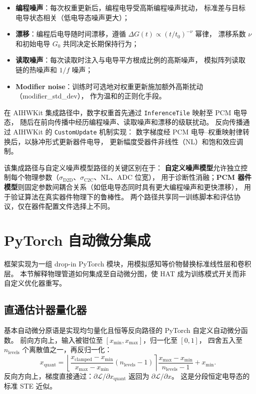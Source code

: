 \begin{itemize}
    \item \textbf{编程噪声}：每次权重更新后，编程电导受高斯编程噪声扰动，
    标准差与目标电导状态相关（低电导态噪声更大）；
    \item \textbf{漂移}：编程后电导随时间漂移，遵循 $\Delta G(t) \propto (t/t_0)^{-\nu}$ 幂律，
    漂移系数 $\nu$ 和初始电导 $G_0$ 共同决定长期保持行为；
    \item \textbf{读取噪声}：每次读取时注入与电导平方根成比例的高斯噪声，
    模拟阵列读取链的热噪声和 $1/f$ 噪声；
    \item \textbf{Modifier noise}：训练时可选地对权重更新施加额外高斯扰动（modifier\_std\_dev），
    作为温和的正则化手段。
\end{itemize}

在 AIHWKit 集成路径中，数字权重首先通过 \texttt{InferenceTile} 映射至 PCM 电导态，
随后在前向传播中经历编程噪声、读取噪声和漂移的级联扰动。
反向传播通过 AIHWKit 的 \texttt{CustomUpdate} 机制实现：
数字梯度经 PCM 电导--权重映射律转换后，以脉冲形式更新器件电导，
更新幅度受器件非线性（NL）和饱和效应调制。

该集成路径与自定义噪声模型路径的关键区别在于：
\textbf{自定义噪声模型}允许独立控制每个物理参数（$\sigma_{\mathrm{D2D}}$、$\sigma_{\mathrm{C2C}}$、NL、ADC 位宽），
用于诊断性消融；\textbf{PCM 器件模型}则固定参数间耦合关系（如低电导态同时具有更大编程噪声和更快漂移），
用于验证算法在真实器件物理下的鲁棒性。
两个路径共享同一训练脚本和评估协议，仅在器件配置文件选择上不同。

\section{PyTorch 自动微分集成}
\label{sec:pytorch-integration}

框架实现为一组 drop-in PyTorch 模块，用模拟感知等价物替换标准线性层和卷积层。
本节解释物理管道如何集成至自动微分图，使 HAT 成为训练模式开关而非自定义优化器重写。

\subsection{直通估计器量化器}

基本自动微分原语是实现均匀量化且恒等反向路径的 PyTorch 自定义自动微分函数。
前向方向上，输入被钳位至 $[x_{\min}, x_{\max}]$，归一化至 $[0,1]$，
四舍五入至 $n_{\text{levels}}$ 个离散值之一，再反归一化：
\begin{equation}
x_{\text{quant}} = \left\lfloor \frac{x_{\text{clamped}} - x_{\min}}{x_{\max} - x_{\min}} (n_{\text{levels}} - 1) \right\rceil \frac{x_{\max} - x_{\min}}{n_{\text{levels}} - 1} + x_{\min}.
\label{eq:ste-forward}
\end{equation}
反向方向上，梯度直接通过：$\partial \mathcal{L} / \partial x_{\text{quant}}$ 返回为 $\partial \mathcal{L} / \partial x$。
这是分段恒定电导态的标准 STE 近似。

